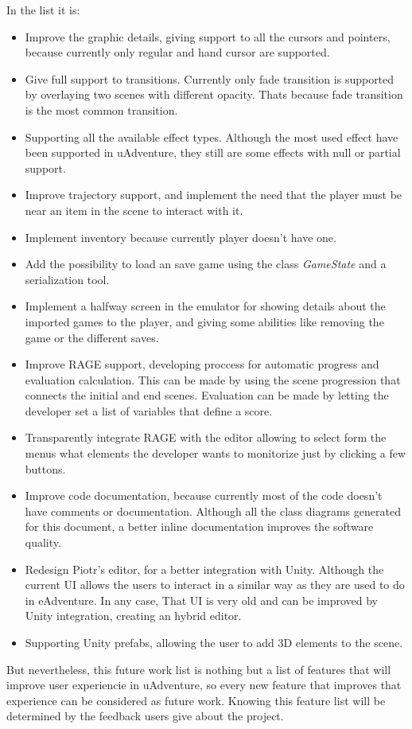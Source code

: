 In the list it is:
\begin{itemize}
	\item Improve the graphic details, giving support to all the cursors and pointers, because currently only regular and hand cursor are supported.
	
	\item Give full support to transitions. Currently only fade transition is supported by overlaying two scenes with different opacity. Thats because fade transition is the most common transition.
	
	\item Supporting all the available effect types. Although the most used effect have been supported in uAdventure, they still are some effects with null or partial support.
	
	\item Improve trajectory support, and implement the need that the player must be near an item in the scene to interact with it.
	
	\item Implement inventory because currently player doesn't have one.
	
	\item Add the possibility to load an save game using the class \textit{GameState} and a serialization tool.
	
	\item Implement a halfway screen in the emulator for showing details about the imported games to the player, and giving some abilities like removing the game or the different saves.
	
	\item Improve RAGE support, developing proccess for automatic progress and evaluation calculation. This can be made by using the scene progression that connects the initial and end scenes. Evaluation can be made by letting the developer set a list of variables that define a score.
	
	\item Transparently integrate RAGE with the editor allowing to select form the menus what elements the developer wants to monitorize just by clicking a few buttons.
	
	\item Improve code documentation, because currently most of the code doesn't have comments or documentation. Although all the class diagrams generated for this document, a better inline documentation improves the software quality.
	
	\item Redesign Piotr's editor, for a better integration with Unity. Although the current UI allows the users to interact in a similar way as they are used to do in eAdventure. In any case, That UI is very old and can be improved by Unity integration, creating an hybrid editor.
	
	\item Supporting Unity prefabs, allowing the user to add 3D elements to the scene.
\end{itemize}

But nevertheless, this future work list is nothing but a list of features that will improve user experiencie in uAdventure, so every new feature that improves that experience can be considered as future work. Knowing this feature list will be determined by the feedback users give about the project.